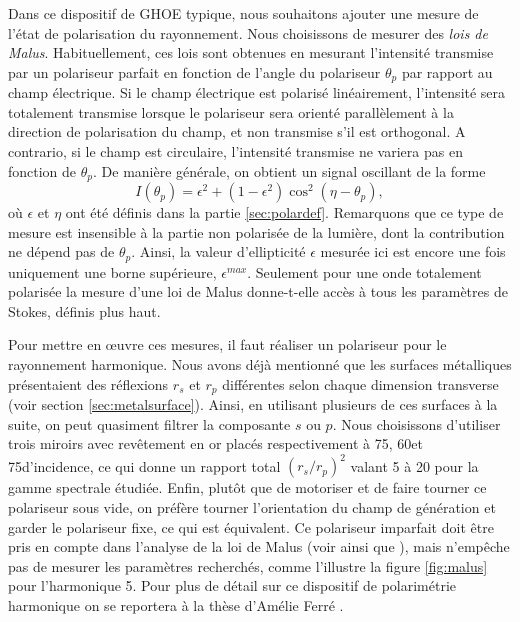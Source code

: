 Dans ce dispositif de GHOE typique, nous souhaitons ajouter une mesure de l'état de polarisation du rayonnement. Nous choisissons de mesurer des \textit{lois de Malus}. Habituellement, ces lois sont obtenues en mesurant l'intensité transmise par un polariseur parfait en fonction de l'angle du polariseur $\theta_p$ par rapport au champ électrique. Si le champ électrique est polarisé linéairement, l'intensité sera totalement transmise lorsque le polariseur sera orienté parallèlement à la direction de polarisation du champ, et non transmise s'il est orthogonal. A contrario, si le champ est circulaire, l'intensité transmise ne variera pas en fonction de $\theta_p$. De manière générale, on obtient un signal oscillant de la forme 
\begin{equation}
I(\theta_p) = \epsilon^2+(1-\epsilon^2)\cos^2(\eta-\theta_p),
\end{equation}
où $\epsilon$ et $\eta$ ont été définis dans la partie \ref{sec:polardef}. Remarquons que ce type de mesure est insensible à la partie non polarisée de la lumière, dont la contribution ne dépend pas de $\theta_p$. Ainsi, la valeur d'ellipticité $\epsilon$ mesurée ici est encore une fois uniquement une borne supérieure, $\epsilon^{max}$. Seulement pour une onde totalement polarisée la mesure d'une loi de Malus donne-t-elle accès à tous les paramètres de Stokes, définis plus haut. 

Pour mettre en œuvre ces mesures, il faut réaliser un polariseur pour le rayonnement harmonique. Nous avons déjà mentionné que les surfaces métalliques présentaient des réflexions $r_s$ et $r_p$ différentes selon chaque dimension transverse (voir section \ref{sec:metalsurface}). Ainsi, en utilisant plusieurs de ces surfaces à la suite, on peut quasiment filtrer la composante $s$ ou $p$. Nous choisissons d'utiliser trois miroirs avec revêtement en or placés respectivement à 75\degres, 60\degres et 75\degres d'incidence, ce qui donne un rapport total $(r_s/r_p)^2$ valant 5 à 20 pour la gamme spectrale étudiée. Enfin, plutôt que de motoriser et de faire tourner ce polariseur sous vide, on préfère tourner l'orientation du champ de génération et garder le polariseur fixe, ce qui est équivalent. Ce polariseur imparfait doit être pris en compte dans l'analyse de la loi de Malus (voir  ainsi que ), mais n'empêche pas de mesurer les paramètres recherchés, comme l'illustre la figure \ref{fig:malus} pour l'harmonique 5. Pour plus de détail sur ce dispositif de polarimétrie harmonique on se reportera à la thèse d'Amélie Ferré .

